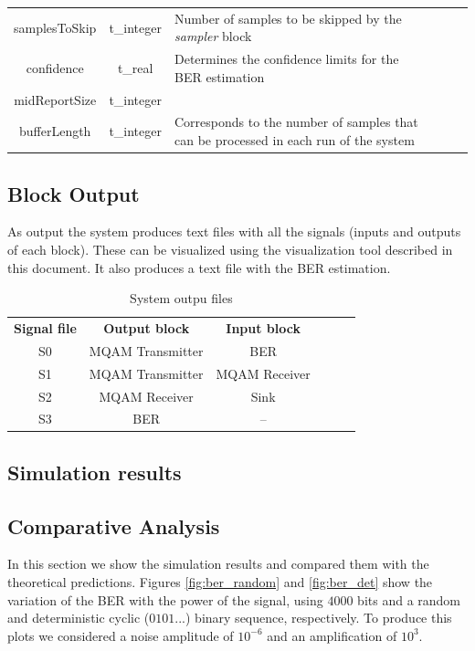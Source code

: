 \begin{table}[]
\begin{tabular}{|c|c|p{60mm}|ccp{60mm}}
		samplesToSkip & t\_integer & Number of samples to be skipped by the \textit{sampler} block &    \\ \cline{1-3}
		confidence & t\_real & Determines the confidence limits for the BER estimation &    \\ \cline{1-3}
		midReportSize & t\_integer &  &    \\ \cline{1-3}
		bufferLength & t\_integer & Corresponds to the number of samples that can be processed in each run of the system &    \\ \cline{1-3}
		\end{tabular}
		\label{table:in_par}
		\end{table}

\subsection*{Block Output}

As output the system produces text files with all the signals (inputs and outputs of each block). These can be visualized using the visualization tool described in this document. It also produces a text file with the BER estimation. 

\begin{table}[]
	\centering
	\begin{tabular}{|c|c|c|ccc}
		\cline{1-3}
		\textbf{Signal file} & \textbf{Output block} & \textbf{Input block}  &  \\ \cline{1-3}
		S0 & MQAM Transmitter & BER &  \\ \cline{1-3}
		S1 & MQAM Transmitter & MQAM Receiver &  \\ \cline{1-3}
		S2 & MQAM Receiver & Sink &   \\ \cline{1-3}
		S3 & BER & \--- &   \\ \cline{1-3}
	\end{tabular}
	\caption{System outpu files}
	\label{table:mqam_out_files}
\end{table}

\subsection*{Simulation results}

\subsection{Comparative Analysis}

In this section we show the simulation results and compared them with the theoretical predictions. Figures \ref{fig:ber_random} and \ref{fig:ber_det} show the variation of the BER with the power of the signal, using $4000$ bits and a random and deterministic cyclic ($0101...$) binary sequence, respectively. To produce this plots we considered a noise amplitude of $10^{-6}$ and an amplification of $10^3$. 

